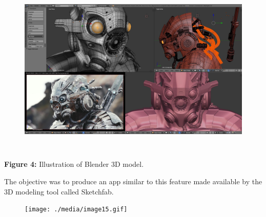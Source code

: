 \documentclass[12pt]{report}
\begin{document}
\begin{figure}[H]
	\begin{Center}
		\includegraphics[width=5.51in,height=3.29in]{./media/image16.png}
	\end{Center}
\end{figure}



\tab \par


\vspace{\baselineskip}
\begin{Center}
\textbf{Figure 4: }Illustration of Blender 3D model.
\end{Center}\par


\vspace{\baselineskip}
\begin{FlushLeft}
The objective was to produce an app similar to this feature made available by the 3D modeling tool called Sketchfab.
\end{FlushLeft}\par




\begin{figure}[H]
	\begin{Center}
		\texttt{[image: ./media/image15.gif]}
	\end{Center}
\end{figure}



\par
\end{document}
